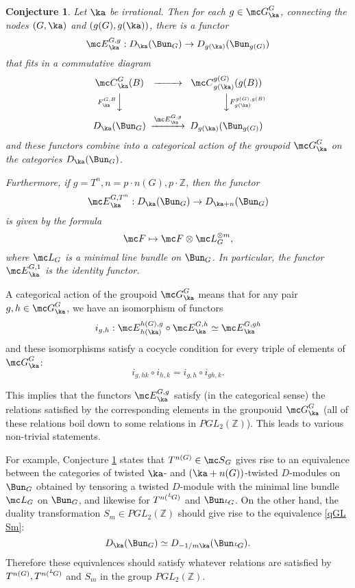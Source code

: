 \documentclass[11pt,reqno]{amsart}
\theoremstyle{plain}
\newtheorem{conj}[theorem]{Conjecture}
\numberwithin{equation}{section}
\newcommand{\Z}{\mathbb{Z}}
\def\neg{\negthinspace}
\def\LG{{}^L\neg G}
\theoremstyle{definition}
\begin{document}
\begin{conj}    \label{qGL functors}
Let $\ka$ be irrational. Then for each $g \in {\mc G}^G_\ka$, connecting
the nodes $(G,\ka)$ and $(g(G),g(\ka))$, there is a functor
$$
{\mc E}^{G,g}_\ka: D_\ka(\Bun_G) \to
  D_{g(\ka)}(\Bun_{g(G)})
$$
that fits in a commutative diagram
\begin{equation}    \label{diagram}
\begin{CD}
{\mc C}^G_{\ka}(B) @>>> {\mc C}^{g(G)}_{g(\ka)}(g(B)) \\
@V{F^{G,B}_\ka}VV @VV{F^{g(G),g(B)}_{g(\ka)}}V \\
D_\ka(\Bun_G) @>{{\mc E}^{G,g}_\ka}>> D_{g(\ka)}(\Bun_{g(G)})
\end{CD}
\end{equation}
and these functors combine into a categorical action of the groupoid
${\mc G}^G_\ka$ on the categories $D_\ka(\Bun_G)$.

Furthermore, if $g=T^n, n = p \cdot n(G), p \cdot \Z$, then the
functor
$$
{\mc E}^{G,T^n}_\ka: D_{\ka}(\Bun_G) \to D_{\ka+n}(\Bun_G)
$$
is given by the formula
$$
{\mc F} \mapsto {\mc
  F} \otimes {\mc L}^{\otimes m}_G,
$$
where ${\mc L}_G$ is a minimal line bundle on $\Bun_G$. In particular,
the functor ${\mc E}^{G,1}_\ka$ is the identity functor.
\end{conj}

A categorical action of the groupoid ${\mc G}^G_\ka$ means that for
any pair $g,h \in {\mc G}^G_\ka$, we have an isomorphism of functors
$$
i_{g,h}: {\mc E}^{h(G),g}_{h(\ka)} \circ {\mc E}^{G,h}_\ka
\simeq {\mc E}^{G,gh}_\ka
$$
and these isomorphisms satisfy a cocycle condition for every triple of
elements of ${\mc G}^G_\ka$:
$$
i_{g,hk} \circ i_{h,k} = i_{g,h} \circ i_{gh,k}.
$$

This implies that the functors ${\mc E}^{G,g}_\ka$ satisfy (in the
categorical sense) the relations satisfied by the corresponding
elements in the groupouid ${\mc G}^G_\ka$ (all of these relations
boil down to some relations in $PGL_2(\Z)$). This leads to various
non-trivial statements.

For example, Conjecture \ref{qGL functors} states that $T^{n(G)} \in
{\mc S}_G$ gives rise to an equivalence between the categories of
twisted $\ka$- and $(\ka+n(G))$-twisted $D$-modules on $\Bun_G$
obtained by tensoring a twisted $D$-module with the minimal line
bundle ${\mc L}_G$ on $\Bun_G$, and likewise for $T^{n(\LG)}$ and
$\Bun_{\LG}$. On the other hand, the duality transformation $S_m \in
PGL_2(\Z)$ should give rise to the equivalence \eqref{qGL Sm}:
$$
D_{\ka}(\Bun_G) \simeq D_{-1/m\ka}(\Bun_{\LG}).
$$
Therefore these equivalences should satisfy whatever relations are
satisfied by $T^{n(G)}, T^{n(\LG)}$ and $S_m$ in the group $PGL_2(\Z)$.
\end{document}
